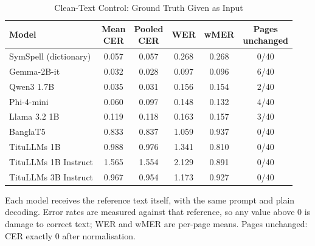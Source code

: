 \begin{table}[t]
\centering
\caption{Clean-Text Control: Ground Truth Given as Input}
\label{tab:clean}
\setlength{\tabcolsep}{3pt}
\footnotesize
\begin{tabular}{lccccc}
\toprule
Model & \shortstack{Mean\\CER} & \shortstack{Pooled\\CER} & WER & wMER & \shortstack{Pages\\unchanged} \\
\midrule
SymSpell (dictionary) & 0.057 & 0.057 & 0.268 & 0.268 & 0/40 \\
Gemma-2B-it & 0.032 & 0.028 & 0.097 & 0.096 & 6/40 \\
Qwen3 1.7B & 0.035 & 0.031 & 0.156 & 0.154 & 2/40 \\
Phi-4-mini & 0.060 & 0.097 & 0.148 & 0.132 & 4/40 \\
Llama 3.2 1B & 0.119 & 0.118 & 0.163 & 0.157 & 3/40 \\
BanglaT5 & 0.833 & 0.837 & 1.059 & 0.937 & 0/40 \\
TituLLMs 1B & 0.988 & 0.976 & 1.341 & 0.810 & 0/40 \\
TituLLMs 1B Instruct & 1.565 & 1.554 & 2.129 & 0.891 & 0/40 \\
TituLLMs 3B Instruct & 0.967 & 0.954 & 1.173 & 0.927 & 0/40 \\
\bottomrule
\end{tabular}
\par\smallskip
\begin{minipage}{\linewidth}\footnotesize Each model receives the reference text itself, with the same prompt and plain decoding. Error rates are measured against that reference, so any value above 0 is damage to correct text; WER and wMER are per-page means. Pages unchanged: CER exactly 0 after normalisation.\end{minipage}
\end{table}
